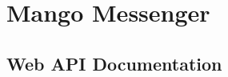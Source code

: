 \chapter{Mango Messenger}\label{ch:mango-messenger}

\section{Web API Documentation}\label{sec:web-api-documentation}